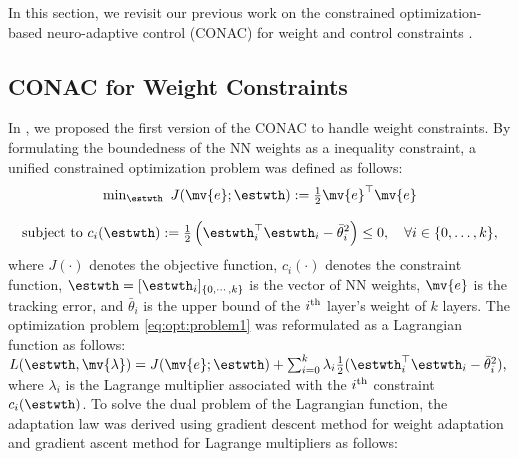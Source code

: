 \documentclass[letterpaper, 10 pt, conference]{ieeeconf}  %
\begin{document}
In this section, we revisit our previous work on the constrained optimization-based neuro-adaptive control (CONAC) for weight \cite{Ryu:2024aa} and control constraints \cite{Ryu:2024ab,Ryu:2025aa}.

\subsection{CONAC for Weight Constraints}

In \cite{Ryu:2024aa}, we proposed the first version of the CONAC to handle weight constraints.
By formulating the boundedness of the NN weights as a inequality constraint, a unified constrained optimization problem was defined as follows:
\begin{equation}
    \begin{matrix}
        \min_{\estwth} \ J(\mv{e};\estwth):= 
        \tfrac{1}{2} \mv{e}^\top \mv{e}
        \\ \\
        \begin{aligned}
        \text{subject to }&
            c_i(\estwth)
            :=
            \tfrac{1}{2}
            \left(
                \estwth_i^\top \estwth_i - {\bar\theta}_i^2
            \right)
        \le0, \quad \forall i\in\{0,\ldots,k\} \\
        \end{aligned}
        ,
    \end{matrix}
    \label{eq:opt:problem1}
\end{equation}
where $J(\cdot)$ denotes the objective function, $c_i(\cdot)$ denotes the constraint function, $\estwth=[\estwth_i]_{\{0,\cdots,k\}}$ is the vector of NN weights, $\mv{e}$ is the tracking error, and $\bar\theta_i$ is the upper bound of the $i\textsuperscript{th}$ layer's weight of $k$ layers.
The optimization problem \eqref{eq:opt:problem1} was reformulated as a Lagrangian function as follows:
$
    L(\estwth,\mv{\lambda}) = J(\mv{e};\estwth) + \sum_{i=0}^k \lambda_i \tfrac{1}{2}(\estwth_i^\top \estwth_i - {\bar\theta}_i^2)
    ,
$
where $\lambda_i$ is the Lagrange multiplier associated with the $i\textsuperscript{th}$ constraint $c_i(\estwth)$.
To solve the dual problem of the Lagrangian function, the adaptation law was derived using gradient descent method for weight adaptation and gradient ascent method for Lagrange multipliers as follows:
\end{document}
